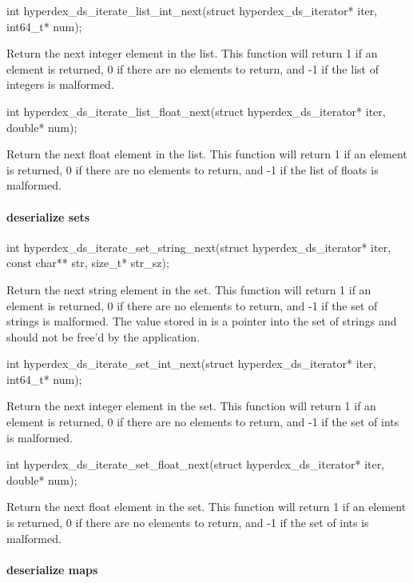 \begin{ccode}
int hyperdex_ds_iterate_list_int_next(struct hyperdex_ds_iterator* iter, int64_t* num);
\end{ccode}
Return the next integer element in the list.  This function will
return 1 if an element is returned, 0 if there are no elements to return, and -1
if the list of integers is malformed.

\begin{ccode}
int hyperdex_ds_iterate_list_float_next(struct hyperdex_ds_iterator* iter, double* num);
\end{ccode}
Return the next float element in the list.  This function will return
1 if an element is returned, 0 if there are no elements to return, and -1 if the
list of floats is malformed.

\paragraph{deserialize sets}

\begin{ccode}
int hyperdex_ds_iterate_set_string_next(struct hyperdex_ds_iterator* iter,
                                        const char** str, size_t* str_sz);
\end{ccode}
Return the next string element in the set.  This function will return
1 if an element is returned, 0 if there are no elements to return, and -1 if the
set of strings is malformed.  The value stored in  is a pointer into
the set of strings and should not be free'd by the application.

\begin{ccode}
int hyperdex_ds_iterate_set_int_next(struct hyperdex_ds_iterator* iter, int64_t* num);
\end{ccode}
Return the next integer element in the set.  This function will return
1 if an element is returned, 0 if there are no elements to return, and -1 if the
set of ints is malformed.

\begin{ccode}
int hyperdex_ds_iterate_set_float_next(struct hyperdex_ds_iterator* iter, double* num);
\end{ccode}
Return the next float element in the set.  This function will return 1
if an element is returned, 0 if there are no elements to return, and -1 if the
set of ints is malformed.

\paragraph{deserialize maps}

